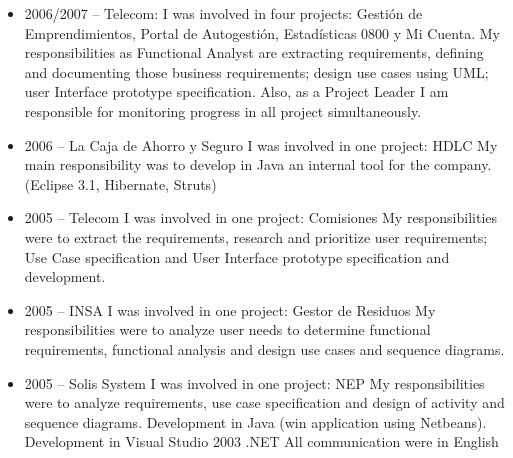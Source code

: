 \documentclass[11pt,a4paper,sans]{moderncv}
\begin{document}
\begin{itemize}
  \item 2006/2007 – Telecom: \newline{}
I was involved in four projects: Gestión de Emprendimientos, Portal de Autogestión, Estadísticas 0800 y Mi Cuenta.
My responsibilities as Functional Analyst are extracting requirements, defining and documenting those business requirements; design use cases using UML;  user Interface prototype specification. Also, as a Project Leader I am responsible for monitoring progress in all project simultaneously.

  \item 2006 –  La Caja de Ahorro y Seguro \newline{}
I was involved in one project: HDLC
My main responsibility was to develop in Java an internal tool for the company. (Eclipse 3.1, Hibernate, Struts)

  \item 2005 – Telecom \newline{}
I was involved in one project: Comisiones
My responsibilities were to extract the requirements, research and prioritize user requirements; Use Case specification and User Interface prototype specification and development.

  \item 2005 – INSA \newline{}
I was involved in one project: Gestor de Residuos
My responsibilities were to analyze user needs to determine functional requirements, functional analysis and design use cases and sequence diagrams.

  \item 2005 – Solis System \newline{}
I was involved in one project: NEP
My responsibilities were to analyze requirements, use case specification and design of activity and sequence diagrams.
Development in Java (win application using Netbeans).
Development in Visual Studio 2003 .NET
All communication were in English
\newline{}
\end{itemize}




\clearpage
\end{document}
